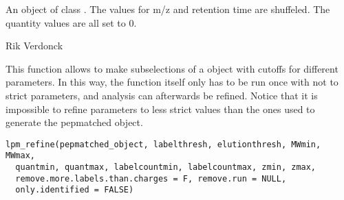 \documentclass[letterpaper]{book}
\begin{document}
%
\begin{Value}
An object of class . The values for m/z and retention time are shuffeled. The quantity values are all set to 0.
\end{Value}
%
\begin{Author}\relax
Rik Verdonck
\end{Author}
%
\begin{SeeAlso}\relax
{}
\end{SeeAlso}
%
\begin{Description}\relax
This function allows to make subselections of a  object with cutoffs for different parameters. In this way, the  function itself only has to be run once with not to strict parameters, and analysis can afterwards be refined. Notice that it is impossible to refine parameters to less strict values than the ones used to generate the pepmatched object.
\end{Description}
%
\begin{Usage}
\begin{verbatim}
lpm_refine(pepmatched_object, labelthresh, elutionthresh, MWmin, MWmax,
  quantmin, quantmax, labelcountmin, labelcountmax, zmin, zmax,
  remove.more.labels.than.charges = F, remove.run = NULL,
  only.identified = FALSE)
\end{verbatim}
\end{Usage}
%
\end{document}

